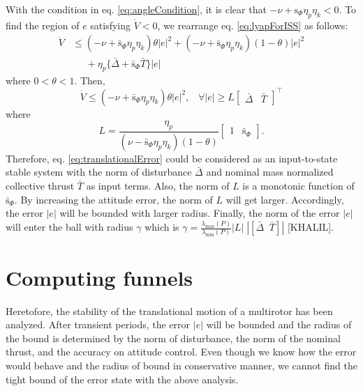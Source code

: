 \documentclass[letterpaper, 10 pt, conference]{ieeeconf}  %
\begin{document}
With the condition in eq. \eqref{eq:angleCondition}, it is clear that $-\nu+\text{s}_\Phi\eta_p\eta_k < 0$. 
To find the region of $e$ satisfying $\dot{V} < 0$, we rearrange eq. \eqref{eq:lyapForISS} as follows:
\begin{align}
\dot{V} &\leq (-\nu+\bar{\text{s}}_\Phi\eta_p\eta_k)\theta|e|^2 + (-\nu+\bar{\text{s}}_\Phi\eta_p\eta_k)(1-\theta)|e|^2 \nonumber \\
&\;\;\;\;\;+\eta_p\{\bar{\Delta} + \bar{\text{s}}_\Phi \bar{T}\}|e| \nonumber 
\end{align}
where $0<\theta<1$. 
Then, 
\begin{equation}
\dot{V} \leq (-\nu+\bar{\text{s}}_\Phi\eta_p\eta_k)\theta|e|^2,\;\;\; \forall |e| \geq L \left[\begin{array}{ll}\bar{\Delta} & \bar{T}\end{array}\right]^\intercal \label{eq:forConstraint} 
\end{equation}
where
\begin{equation}
L = \frac{\eta_p}{(\nu-\bar{\text{s}}_\Phi\eta_p\eta_k)(1-\theta)}[\begin{array}{cc}1 & \bar{\text{s}}_\Phi \end{array}]. \nonumber
\end{equation}
Therefore, eq. \eqref{eq:translationalError} could be considered as an input-to-state stable system with the norm of disturbance $\bar{\Delta}$ and nominal mass normalized collective thrust $\bar{T}$ as input terms.
Also, the norm of $L$ is a monotonic function of $\bar{\text{s}}_\Phi$. By increasing the attitude error, the norm of $L$ will get larger. 
Accordingly, the error $|e|$ will be bounded with larger radius. 
Finally, the norm of the error $|e|$ will enter the ball with radius $\gamma$ which is $\gamma = \frac{\lambda_{\max}(P)}{\lambda_{\min}(P)}|L|\;|[\bar{\Delta}\;\;\bar{T}]|$ [KHALIL].

\section{Computing funnels}
Heretofore, the stability of the translational motion of a multirotor has been analyzed. 
After transient periods, the error $|e|$ will be bounded and the radius of the bound is determined by the norm of disturbance, the norm of the nominal thrust, and the accuracy on attitude control. 
Even though we know how the error would behave and the radius of bound in conservative manner, we cannot find the tight bound of the error state with the above analysis. 
\end{document}
